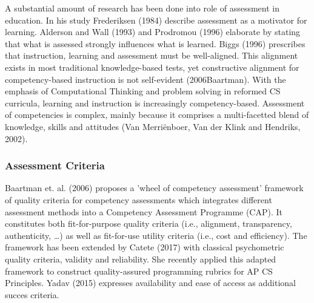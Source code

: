 A substantial amount of research has been done into role of assessment in education. In his study Frederiksen (1984) describe assessment as a motivator for learning. Alderson and Wall (1993) and Prodromou (1996) elaborate by stating that what is assessed strongly influences what is learned. Biggs (1996) prescribes that instruction, learning and assessment must be well-aligned. This alignment exists in most traditional knowledge-based tests, yet constructive alignment for competency-based instruction is not self-evident (2006Baartman). With the emphasis of Computational Thinking and problem solving in reformed CS curricula, learning and instruction is increasingly competency-based. Assessment of competencies is complex, mainly because it comprises a multi-facetted blend of knowledge, skills and attitudes (Van Merriënboer, Van der Klink and Hendriks, 2002).

\subsubsection*{Assessment Criteria}\label{sec:qualityCriteria}
Baartman et. al. (2006) proposes a 'wheel of competency assessment' framework of quality criteria for competency assessments which integrates different assessment methods into a Competency Assessment Programme (CAP). It constitutes both fit-for-purpose quality criteria (i.e., alignment, transparency, authenticity, \ldots) as well as fit-for-use utility criteria (i.e., cost and efficiency). The framework has been extended by Catete (2017) with classical psychometric quality criteria, validity and reliability. She recently applied this adapted framework to construct quality-assured programming rubrics for AP CS Principles. Yadav (2015) expresses availability and ease of access as additional succes criteria.




